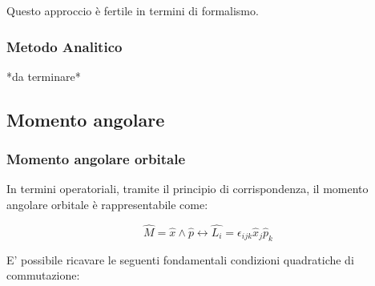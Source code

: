 \documentclass{article}
\begin{document}
Questo approccio è fertile in termini di formalismo.

\subsubsection{Metodo Analitico}
*da terminare*


\subsection{Momento angolare}
\subsubsection{Momento angolare orbitale}
In termini operatoriali, tramite il principio di corrispondenza, il momento angolare orbitale è rappresentabile come:

\begin{equation}
    \hat{M}=\hat{x}\wedge \hat{p} \leftrightarrow \hat{L_i}=\epsilon_{ijk}\hat{x}_j\hat{p}_k
\end{equation}

E' possibile ricavare le seguenti fondamentali condizioni quadratiche di commutazione:
\end{document}
